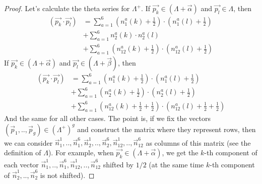 \documentclass{article}
\theoremstyle{plain}
\theoremstyle{definition}
\begin{document}
\begin{proof}
        Let's calculate the theta series for $\Lambda^+$. 
        If 
        ${\vec{p_k}} \in (\Lambda + \vec{\alpha})$ and ${\vec{p_l}} \in \Lambda$, then
        \begin{align}
            ({\vec{p_k}} \cdot {\vec{p_l}}) &= 
            \sum_{a=1}^6 (n_1^a(k) + \frac{1}{2}) \cdot (n_1^a(l) + \frac{1}{2}) \nonumber \\
            &+\sum_{a=1}^6 n_2^a(k) \cdot n_2^a(l) \nonumber \\
            &+\sum_{a=1}^6 (n_{12}^a(k) + \frac{1}{2}) \cdot (n_{12}^a(l) + \frac{1}{2})
        \end{align}
        If ${\vec{p_k}} \in (\Lambda + \vec{\alpha})$ and ${\vec{p_l}} \in (\Lambda + \vec{\beta})$, then
        \begin{align}
            ({\vec{p_k}} \cdot {\vec{p_l}}) &=
            \sum_{a=1}^6 (n_1^a(k) + \frac{1}{2}) \cdot (n_1^a(l) + \frac{1}{2}) \nonumber \\
            &+ \sum_{a=1}^6 (n_2^a(k) + \frac{1}{2}) \cdot (n_2^a(l) + \frac{1}{2}) \nonumber \\
            &+ \sum_{a=1}^6 (n_{12}^a(k) + \frac{1}{2} + \frac{1}{2}) 
                \cdot (n_{12}^a(l) + \frac{1}{2} + \frac{1}{2})
        \end{align}
        And the same for all other cases. The point is, if we fix the vectors
        $(\vec p_1, .., \vec p_g) \in (\Lambda^+)^g$ and construct the matrix where they represent rows, then
        we can consider
        $\vec{n}_1^1, .., \vec{n}_1^6, \vec{n}_2^1, .., \vec{n}_2^6, \vec{n}_{12}^1, .., \vec{n}_{12}^6$ as columns of this matrix
        (see the definition of $\Lambda$).
        For example, when ${\vec{p_k}} \in (\Lambda + \vec{\alpha})$, we get the $k$-th component of each vector
        $\vec{n}_1^1, .., \vec{n}_1^6, \vec{n}_{12}^1, .., \vec{n}_{12}^6$ shifted by $1/2$ 
        (at the same time $k$-th component of $\vec{n}_2^1, .., \vec{n}_2^6$ is not shifted).
        

\end{proof}
\end{document}
